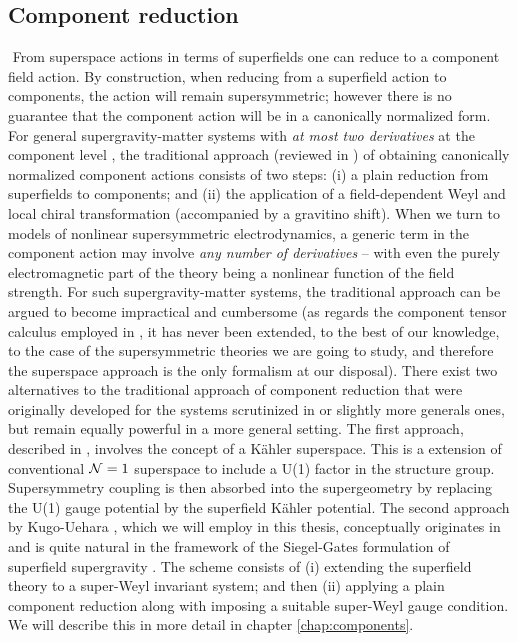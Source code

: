 \subsection*{Component reduction}
${}$\newline
\indent From superspace actions in terms of superfields one can reduce to a component field action. By construction, when reducing from a superfield action to components, the action will remain supersymmetric; however there is no guarantee that the component action will be in a canonically normalized form. For general supergravity-matter systems with {\it at  most two derivatives} at the component level \cite{Cremmer:1978iv,Cremmer:1978hn, Cremmer:1982wb,Cremmer:1982en}, the traditional approach (reviewed in \cite{Bagger:1990qh}) of obtaining canonically normalized component actions consists of two steps: 
(i) a plain reduction from superfields to components; and
(ii) the application of a field-dependent Weyl and local chiral transformation (accompanied by a gravitino shift).  
When we turn to models of nonlinear supersymmetric electrodynamics, a generic term in the component action may involve {\it any number of derivatives} -- with even the purely electromagnetic part of the theory being a nonlinear function of the field strength. For such supergravity-matter systems, the traditional approach can be argued to become impractical and cumbersome (as regards the component tensor calculus employed in \cite{Cremmer:1978iv,Cremmer:1978hn, Cremmer:1982wb,Cremmer:1982en}, it  has never been extended, to the best of our knowledge, to the case of the supersymmetric theories we are going to study, and therefore the superspace approach is the only formalism at our disposal). There exist two alternatives \cite{Kugo:1982mr,Binetruy:2000zx} to the traditional approach of component reduction \cite{Bagger:1990qh} that were originally developed for the systems scrutinized in \cite{Cremmer:1978iv,Cremmer:1978hn, Cremmer:1982wb,Cremmer:1982en} or slightly more generals ones, but remain equally powerful in a more general setting. The first approach, described in \cite{Binetruy:2000zx}, involves the concept of a K{\"a}hler superspace. This is a extension of conventional ${\cal N}=1$ superspace to include a U(1) factor in the structure group. Supersymmetry coupling is then absorbed into the supergeometry by replacing the U(1) gauge potential by the superfield K{\"a}hler potential. The second approach by Kugo-Uehara \cite{Kugo:1982mr}, which we will employ in this thesis, conceptually originates in \cite{Das:1978nr,Kaku:1978nz,Kaku:1978ea} and is quite natural  in the framework of the Siegel-Gates formulation of superfield supergravity \cite{Siegel:1978nn,Siegel:1978mj}. The scheme consists of 
(i) extending the superfield theory to a super-Weyl invariant system; and then 
(ii) applying a plain component reduction along with imposing a suitable super-Weyl gauge condition. We will describe this in more detail in chapter \ref{chap:components}.


